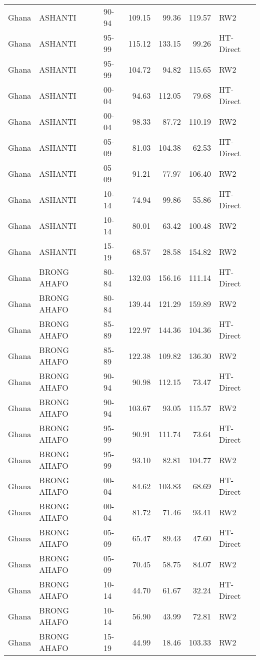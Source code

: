 \begin{longtable}{lllrrrl}
  Ghana & ASHANTI & 90-94 & 109.15 & 99.36 & 119.57 & RW2 \\ 
  Ghana & ASHANTI & 95-99 & 115.12 & 133.15 & 99.26 & HT-Direct \\ 
  Ghana & ASHANTI & 95-99 & 104.72 & 94.82 & 115.65 & RW2 \\ 
  Ghana & ASHANTI & 00-04 & 94.63 & 112.05 & 79.68 & HT-Direct \\ 
  Ghana & ASHANTI & 00-04 & 98.33 & 87.72 & 110.19 & RW2 \\ 
  Ghana & ASHANTI & 05-09 & 81.03 & 104.38 & 62.53 & HT-Direct \\ 
  Ghana & ASHANTI & 05-09 & 91.21 & 77.97 & 106.40 & RW2 \\ 
  Ghana & ASHANTI & 10-14 & 74.94 & 99.86 & 55.86 & HT-Direct \\ 
  Ghana & ASHANTI & 10-14 & 80.01 & 63.42 & 100.48 & RW2 \\ 
  Ghana & ASHANTI & 15-19 & 68.57 & 28.58 & 154.82 & RW2 \\ 
  Ghana & BRONG AHAFO & 80-84 & 132.03 & 156.16 & 111.14 & HT-Direct \\ 
  Ghana & BRONG AHAFO & 80-84 & 139.44 & 121.29 & 159.89 & RW2 \\ 
  Ghana & BRONG AHAFO & 85-89 & 122.97 & 144.36 & 104.36 & HT-Direct \\ 
  Ghana & BRONG AHAFO & 85-89 & 122.38 & 109.82 & 136.30 & RW2 \\ 
  Ghana & BRONG AHAFO & 90-94 & 90.98 & 112.15 & 73.47 & HT-Direct \\ 
  Ghana & BRONG AHAFO & 90-94 & 103.67 & 93.05 & 115.57 & RW2 \\ 
  Ghana & BRONG AHAFO & 95-99 & 90.91 & 111.74 & 73.64 & HT-Direct \\ 
  Ghana & BRONG AHAFO & 95-99 & 93.10 & 82.81 & 104.77 & RW2 \\ 
  Ghana & BRONG AHAFO & 00-04 & 84.62 & 103.83 & 68.69 & HT-Direct \\ 
  Ghana & BRONG AHAFO & 00-04 & 81.72 & 71.46 & 93.41 & RW2 \\ 
  Ghana & BRONG AHAFO & 05-09 & 65.47 & 89.43 & 47.60 & HT-Direct \\ 
  Ghana & BRONG AHAFO & 05-09 & 70.45 & 58.75 & 84.07 & RW2 \\ 
  Ghana & BRONG AHAFO & 10-14 & 44.70 & 61.67 & 32.24 & HT-Direct \\ 
  Ghana & BRONG AHAFO & 10-14 & 56.90 & 43.99 & 72.81 & RW2 \\ 
  Ghana & BRONG AHAFO & 15-19 & 44.99 & 18.46 & 103.33 & RW2 \\ 

\end{longtable}
